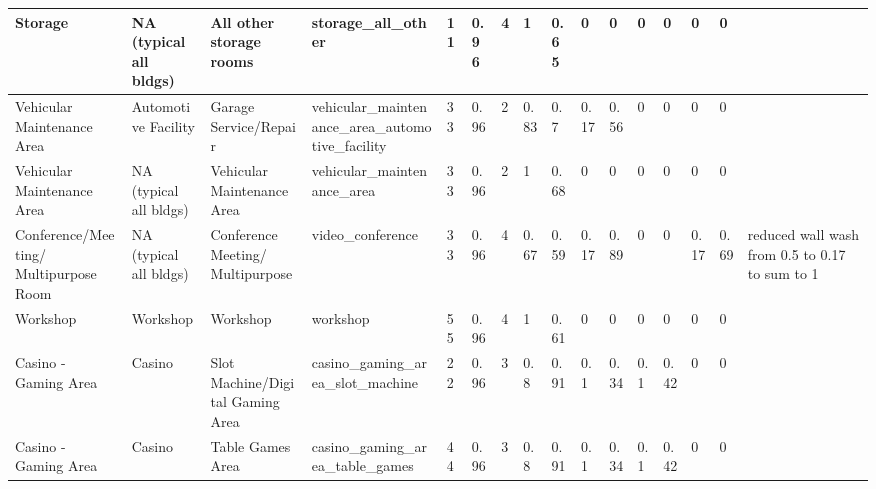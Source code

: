 \begin{center}
\begin{landscape}
\begin{longtable}{|p{0.75in}|p{0.75in}|p{0.75in}|p{0.75in}|p{0.3in}|p{0.3in}|p{0.3in}|p{0.3in}|p{0.3in}|p{0.3in}|p{0.3in}|p{0.3in}|p{0.3in}|p{0.3in}|p{0.3in}|p{0.6in}|}
      Storage                                 & NA (typical all bldgs)      & All other storage rooms                         & storage\_all\_other                                             & 11   & 0.96 & 4  & 1      & 0.65  & 0     & 0     & 0    & 0    & 0    & 0    &                                                                                       \\ \hline
      Vehicular Maintenance Area              & Automotive Facility         & Garage Service/Repair                           & vehicular\_maintenance\_area\_automotive\_facility              & 33   & 0.96 & 2  & 0.83   & 0.7   & 0.17  & 0.56  & 0    & 0    & 0    & 0    &                                                                                       \\ \hline
      Vehicular Maintenance Area              & NA (typical all bldgs)      & Vehicular Maintenance Area                      & vehicular\_maintenance\_area                                    & 33   & 0.96 & 2  & 1      & 0.68  & 0     & 0     & 0    & 0    & 0    & 0    &                                                                                       \\ \hline
      Conference/Meeting/ Multipurpose Room    & NA (typical all bldgs)      & Conference Meeting/ Multipurpose                 & video\_conference                                               & 33   & 0.96 & 4  & 0.67   & 0.59  & 0.17  & 0.89  & 0    & 0    & 0.17 & 0.69 & reduced wall wash from 0.5 to 0.17 to sum to 1                                        \\ \hline
      Workshop                                & Workshop                    & Workshop                                        & workshop                                                        & 55   & 0.96 & 4  & 1      & 0.61  & 0     & 0     & 0    & 0    & 0    & 0    &                                                                                       \\ \hline
      Casino - Gaming Area                    & Casino                      & Slot Machine/Digital Gaming Area              & casino\_gaming\_area\_slot\_machine                             & 22   & 0.96 & 3  & 0.8    & 0.91  & 0.1   & 0.34  & 0.1  & 0.42 & 0    & 0    &                                                                                       \\ \hline
      Casino - Gaming Area                    & Casino                      & Table Games Area                                & casino\_gaming\_area\_table\_games                              & 44   & 0.96 & 3  & 0.8    & 0.91  & 0.1   & 0.34  & 0.1  & 0.42 & 0    & 0    &                                                                                       \\ \hline

\end{longtable}
\end{landscape}
\end{center}
